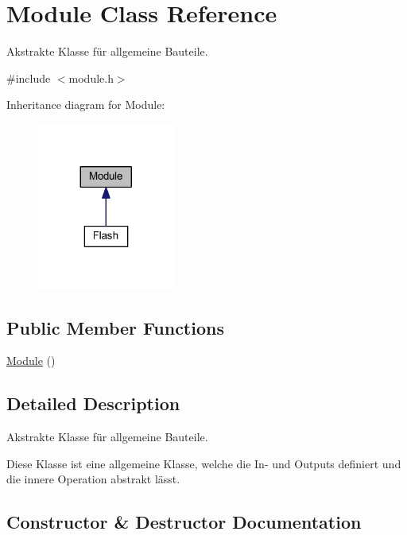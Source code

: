\hypertarget{class_module}{}\section{Module Class Reference}
\label{class_module}


Akstrakte Klasse für allgemeine Bauteile.  




{\ttfamily \#include $<$module.\+h$>$}



Inheritance diagram for Module\+:\nopagebreak
\begin{figure}[H]
\begin{center}
\leavevmode
\includegraphics[width=128pt]{class_module__inherit__graph}
\end{center}
\end{figure}
\subsection*{Public Member Functions}
\begin{DoxyCompactItemize}
\item 
\mbox{\hyperlink{class_module_a5a240a8a9ab1813b17bcb810b24ceaea}{Module}} ()
\end{DoxyCompactItemize}


\subsection{Detailed Description}
Akstrakte Klasse für allgemeine Bauteile. 

Diese Klasse ist eine allgemeine Klasse, welche die In-\/ und Outputs definiert und die innere Operation abstrakt lässt. 

\subsection{Constructor \& Destructor Documentation}
\mbox{\label{class_module_a5a240a8a9ab1813b17bcb810b24ceaea}} 
